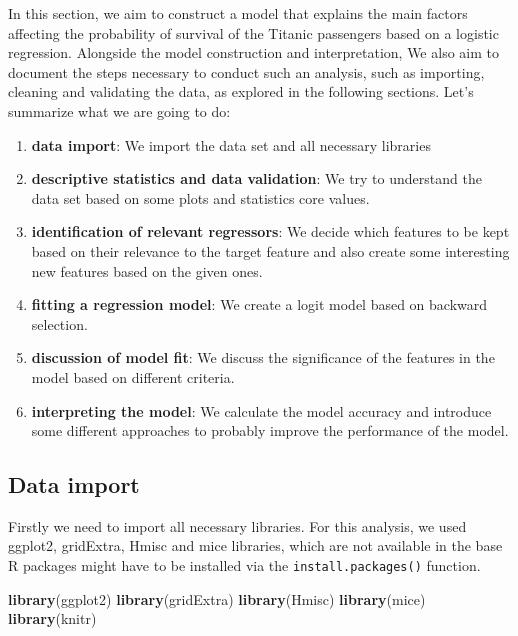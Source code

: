 \documentclass[12,]{article}
\newenvironment{Shaded}{\begin{snugshade}}{\end{snugshade}}
\newcommand{\KeywordTok}[1]{\textcolor[rgb]{0.13,0.29,0.53}{\textbf{#1}}}
\newcommand{\NormalTok}[1]{#1}
\providecommand{\tightlist}{%
  \setlength{\itemsep}{0pt}\setlength{\parskip}{0pt}}
\begin{document}
In this section, we aim to construct a model that explains the main
factors affecting the probability of survival of the Titanic passengers
based on a logistic regression. Alongside the model construction and
interpretation, We also aim to document the steps necessary to conduct
such an analysis, such as importing, cleaning and validating the data,
as explored in the following sections. Let's summarize what we are going
to do:

\begin{enumerate}
\def\labelenumi{\arabic{enumi}.}
\tightlist
\item
  \textbf{data import}: We import the data set and all necessary
  libraries
\item
  \textbf{descriptive statistics and data validation}: We try to
  understand the data set based on some plots and statistics core
  values.
\item
  \textbf{identification of relevant regressors}: We decide which
  features to be kept based on their relevance to the target feature and
  also create some interesting new features based on the given ones.
\item
  \textbf{fitting a regression model}: We create a logit model based on
  backward selection.
\item
  \textbf{discussion of model fit}: We discuss the significance of the
  features in the model based on different criteria.
\item
  \textbf{interpreting the model}: We calculate the model accuracy and
  introduce some different approaches to probably improve the
  performance of the model.
\end{enumerate}

\subsection{Data import}\label{data-import}

Firstly we need to import all necessary libraries. For this analysis, we
used ggplot2, gridExtra, Hmisc and mice libraries, which are not
available in the base R packages might have to be installed via the
\texttt{install.packages()} function.

\begin{Shaded}
\begin{Highlighting}[]
\KeywordTok{library}\NormalTok{(ggplot2)}
\KeywordTok{library}\NormalTok{(gridExtra)}
\KeywordTok{library}\NormalTok{(Hmisc)}
\KeywordTok{library}\NormalTok{(mice)}
\KeywordTok{library}\NormalTok{(knitr)}
\end{Highlighting}
\end{Shaded}
\end{document}
